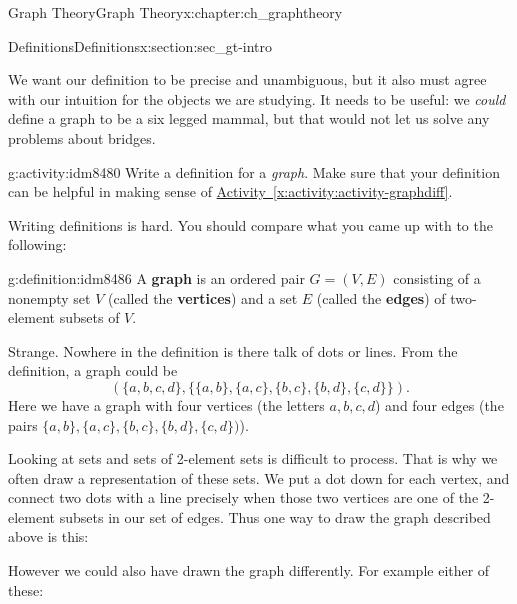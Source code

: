 \documentclass[oneside,10pt,]{book}
\newcommand{\terminology}[1]{\textbf{#1}}
\numberwithin{equation}{chapter}
\newcommand{\vtx}[2]{node[fill,circle,inner sep=0pt, minimum size=4pt,label=#1:#2]{}}
\newcommand{\vr}[1]{\vtx{right}{#1}}
\newcommand{\vl}[1]{\vtx{left}{#1}}
\begin{document}
\begin{chapterptx}{Graph Theory}{}{Graph Theory}{}{}{x:chapter:ch_graphtheory}
\begin{sectionptx}{Definitions}{}{Definitions}{}{}{x:section:sec_gt-intro}
\par
We want our definition to be precise and unambiguous, but it also must agree with our intuition for the objects we are studying.  It needs to be useful: we \emph{could} define a graph to be a six legged mammal, but that would not let us solve any problems about bridges.%
\begin{activity}{}{g:activity:idm8480}%
Write a definition for a \emph{graph}.  Make sure that your definition can be helpful in making sense of \hyperref[x:activity:activity-graphdiff]{Activity~\ref{x:activity:activity-graphdiff}}.%
\end{activity}
Writing definitions is hard.  You should compare what you came up with to the following:%
\begin{definition}{}{g:definition:idm8486}%
A \terminology{graph} is an ordered pair \(G = (V, E)\) consisting of a nonempty set \(V\) (called the \terminology{vertices}) and a set \(E\) (called the \terminology{edges}) of two-element subsets of \(V\).%
\end{definition}
Strange.  Nowhere in the definition is there talk of dots or lines.  From the definition, a graph could be%
\begin{equation*}
(\{a,b,c,d\}, \{\{a,b\}, \{a,c\}, \{b,c\}, \{b,d\}, \{c,d\}\}).
\end{equation*}
Here we have a graph with four vertices  (the letters \(a, b, c, d\)) and four edges (the pairs \(\{a,b\}, \{a,c\}, \{b,c\}, \{b,d\}, \{c,d\})\)).%
\par
Looking at sets and sets of 2-element sets is difficult to process.  That is why we often draw a representation of these sets.  We put a dot down for each vertex, and connect two dots with a line precisely when those two vertices are one of the 2-element subsets in our set of edges.  Thus one way to draw the graph described above is this:%
\begin{sidebyside}{1}{0.375}{0.375}{0}%
\begin{sbspanel}{0.25}%
\resizebox{\linewidth}{!}{%
\begin{tikzpicture}[scale=0.7]
   \draw  (-1,1) \vl{\(a\)} -- (1,1) \vr{\(b\)} (-1,1) -- (-1,-1) \vl{\(c\)} -- (1,-1) \vr{\(d\)} -- (1,1) -- (-1,-1);
 \end{tikzpicture}
}%
\end{sbspanel}%
\end{sidebyside}%
\par
However we could also have drawn the graph differently. For example either of these:%
\begin{sidebyside}{2}{0.1375}{0.1375}{0.275}%

\end{sidebyside}
\end{sectionptx}
\end{chapterptx}
\end{document}
